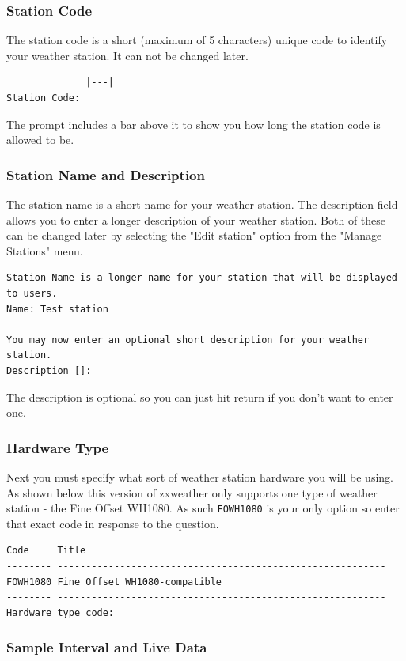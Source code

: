 \documentclass[a4paper,10pt,draft]{book}
\begin{document}
\subsubsection{Station Code}
The station code is a short (maximum of 5 characters) unique code to identify your weather station. It can not be changed later.

\begin{verbatim}
              |---|
Station Code:
\end{verbatim}

The prompt includes a bar above it to show you how long the station code is allowed to be.

\subsubsection{Station Name and Description}
The station name is a short name for your weather station. The description field allows you to enter a longer description of your weather station. Both of these can be changed later by selecting the "Edit station" option from the "Manage Stations" menu.

\begin{verbatim}
Station Name is a longer name for your station that will be displayed 
to users.
Name: Test station

You may now enter an optional short description for your weather
station.
Description []:
\end{verbatim}

The description is optional so you can just hit return if you don't want to enter one.

\subsubsection{Hardware Type}
Next you must specify what sort of weather station hardware you will be using. As shown below this version of zxweather only supports one type of weather station - the Fine Offset WH1080. As such \verb|FOWH1080| is your only option so enter that exact code in response to the question.

\begin{verbatim}
Code     Title
-------- ----------------------------------------------------------
FOWH1080 Fine Offset WH1080-compatible
-------- ----------------------------------------------------------
Hardware type code:
\end{verbatim}

\subsubsection{Sample Interval and Live Data}
\end{document}
